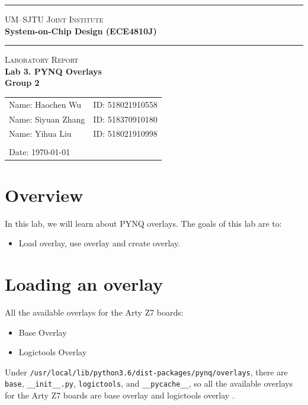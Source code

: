 \documentclass[a4paper]{article}
\begin{document}
\begin{titlepage}
    \vspace*{0.25cm}
    \noindent\rule[0.25\baselineskip]{\textwidth}{1pt}
    \begin{center}
        \huge{\textsc{UM--SJTU Joint Institute}}\vspace{0.3em}\\
        \huge{\textbf{System-on-Chip Design (ECE4810J)}}\vspace{0.3em}\\
        \noindent\rule[0.25\baselineskip]{\textwidth}{1pt}
    \end{center}
    \begin{center}
        \vspace{5cm}
        \Large{\textsc{Laboratory Report}}\vspace{0.5em}\\
        \Large{\textbf{Lab 3. PYNQ Overlays}}\vspace{1em}\\
        \Large{\textbf{Group 2}}\\
    \end{center}
    \vfill
    \large
    \begin{tabular}{ll}
        Name: Haochen Wu \hspace*{2em}&ID: 518021910558\hspace*{2em}\\
        Name: Siyuan Zhang \hspace*{2em}&ID: 518370910180 \hspace*{2em}\\
        Name: Yihua Liu \hspace*{2em}&ID: 518021910998\hspace*{2em}\\
        \\
        Date: \today
    \end{tabular}
\end{titlepage}
\tableofcontents
\newpage
\section{Overview}
In this lab, we will learn about PYNQ overlays. The goals of this lab are to:
\begin{itemize}
    \item Load overlay, use overlay and create overlay.
\end{itemize}
\section{Loading an overlay}
All the available overlays for the Arty Z7 boards:
\begin{itemize}
    \item Base Overlay
    \item Logictools Overlay
\end{itemize}
Under \texttt{/usr/local/lib/python3.6/dist-packages/pynq/overlays}, there are \texttt{base}, \texttt{\_\_init\_\_.py}, \texttt{logictools}, and \texttt{\_\_pycache\_\_}, so all the available overlays for the Arty Z7 boards are base overlay and logictools overlay \cite{pynqdoc251}.
\end{document}

